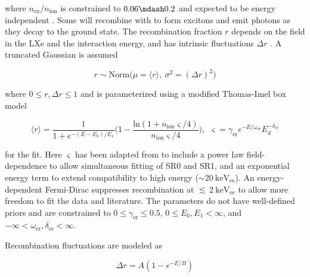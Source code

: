 \noindent where $n_{\mathrm{ex}} / n_{\mathrm{ion}}$ is constrained to $0.06 \mdash 0.2$ and expected to be energy independent
.  Some \electron will recombine with  to form
excitons and emit photons as they decay to the ground state.  The recombination fraction $r$ depends on the field in the LXe and the
interaction energy, and has intrinsic fluctuations $\Delta r$ .  A truncated Gaussian is assumed

\vspace{-10pt}

\begin{equation}
r \sim \mathrm{Norm} \Big( \mu = \langle r \rangle,\ \sigma^2 = (\Delta r)^2 \Big)
\end{equation}

\noindent where $0 \leq r, \Delta r \leq 1$ and is parameterized using a modified Thomas-Imel box model 

\vspace{-20pt}

\begin{equation}
\langle r \rangle = \frac{1}{1 + e^{-(E - E_0) / E_1}}
\bigg( 1 - \frac{\mathrm{ln}(1 + n_{\mathrm{ion}} \varsigma / 4)}{n_{\mathrm{ion}} \varsigma / 4} \bigg)
,\ \ \varsigma = \gamma_{\mathrm{er}} e^{-E / \omega_{\mathrm{er}}} E_d^{-\delta_{\mathrm{er}}}
\label{eq:er_nr_calibrations_parameter_determ_ti}
\end{equation}

\noindent for the fit.  Here $\varsigma$ has been adapted from  to include a power law field-dependence to allow
simultaneous fitting of SR0 and SR1, and an exponential energy term to extend compatibility to high energy
(${\sim} 20\ \mathrm{keV_{ee}}$).  An energy-dependent Fermi-Dirac suppresses recombination at
${\lesssim}\, 2\ \mathrm{keV_{ee}}$ to allow more freedom to fit the data and literature.  The parameters do not have well-defined priors
and are constrained to $0 \leq \gamma_{\mathrm{er}} \leq 0.5$, $0 \leq E_0, E_1 < \infty$, and
$-\infty < \omega_{\mathrm{er}}, \delta_{\mathrm{er}} < \infty$.

Recombination fluctuations are modeled as

\vspace{-10pt}

\begin{equation}
\Delta r = A(1 - e^{-E/B})
\label{eq:er_nr_calibrations_parameter_determ_er_rec_fluctuations}
\end{equation}


